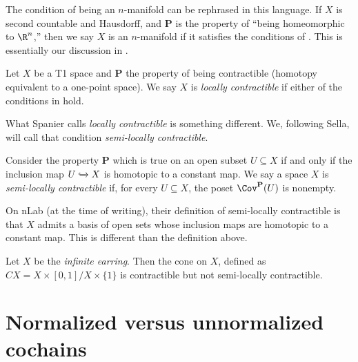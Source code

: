 \documentclass[11pt]{book}
\begin{document}
\begin{remark} The condition of being an $n$-manifold can be rephrased in this language. If $X$ is second countable and Hausdorff, and \textbf{P} is the property of ``being homeomorphic to $\R^n$,'' then we say $X$ is an $n$-manifold if it satisfies the conditions of . This is essentially our discussion in .
\end{remark}

\begin{definition}\label{def:locally-contractible} Let $X$ be a T1 space and \textbf{P} the property of being contractible (homotopy equivalent to a one-point space). We say $X$ is \emph{locally contractible} if either of the conditions in  hold.
\end{definition}

What Spanier calls \emph{locally contractible} is something different. We, following Sella, will call that condition \emph{semi-locally contractible}.

\begin{definition}\label{def:semi-locally-contractible} Consider the property \textbf{P} which is true on an open subset $U \subseteq X$ if and only if the inclusion map $U \xhookrightarrow{} X$ is homotopic to a constant map. We say a space $X$ is \emph{semi-locally contractible} if, for every $U \subseteq X$, the poset $\Cov^{\mathbf{P}}(U)$ is nonempty.
\end{definition}

\begin{remark} On nLab (at the time of writing), their definition of semi-locally contractible is that $X$ admits a basis of open sets whose inclusion maps are homotopic to a constant map. This is different than the definition above.
\end{remark}

\begin{example} Let $X$ be the \emph{infinite earring}. Then the cone on $X$, defined as $CX = X \times [0,1] / X \times \{1\}$ is contractible but not semi-locally contractible.
\end{example}

\section{Normalized versus unnormalized cochains}
\end{document}
